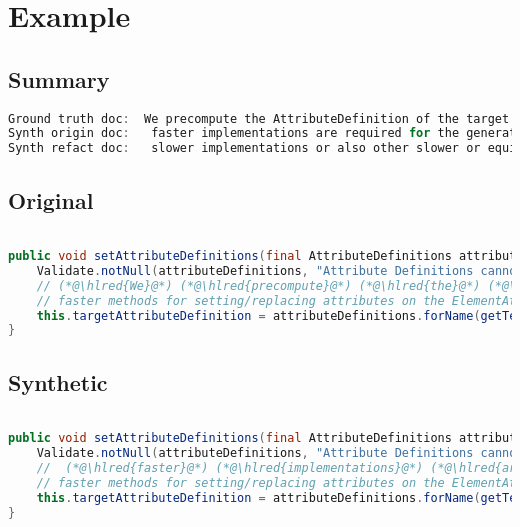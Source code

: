 \documentclass[11pt]{article}
\DeclareRobustCommand{\hlred}[1]{{\sethlcolor{YellowOrange}\hl{#1}}}
\begin{document}
\pagebreak
\section{Example}
\subsection{Summary}

\begin{lstlisting}[language=java]
Ground truth doc:  We precompute the AttributeDefinition of the target attribute in order to being able to use much
Synth origin doc:   faster implementations are required for the generation but cannot override or replace attributes instead of just
Synth refact doc:   slower implementations or also other slower or equivalent methods are encouraged and can instead invoke only
\end{lstlisting}

\subsection{Original}
\begin{lstlisting}[language=java]

public void setAttributeDefinitions(final AttributeDefinitions attributeDefinitions) {
    Validate.notNull(attributeDefinitions, "Attribute Definitions cannot be null");
    // (*@\hlred{We}@*) (*@\hlred{precompute}@*) (*@\hlred{the}@*) (*@\hlred{AttributeDefinition}@*) (*@\hlred{of}@*) the (*@\hlred{target}@*) (*@\hlred{attribute}@*) (*@\hlred{in}@*) (*@\hlred{order}@*) (*@\hlred{to}@*) (*@\hlred{being}@*) (*@\hlred{able}@*) (*@\hlred{to}@*) (*@\hlred{use}@*) (*@\hlred{much}@*)
    // faster methods for setting/replacing attributes on the ElementAttributes implementation
    this.targetAttributeDefinition = attributeDefinitions.forName(getTemplateMode(), this.targetAttrCompleteName);
}
\end{lstlisting}
\subsection{Synthetic}

\begin{lstlisting}[language=java]

public void setAttributeDefinitions(final AttributeDefinitions attributeDefinitions) {
    Validate.notNull(attributeDefinitions, "Attribute Definitions cannot be null");
    //  (*@\hlred{faster}@*) (*@\hlred{implementations}@*) (*@\hlred{are}@*) (*@\hlred{required}@*) (*@\hlred{for}@*) the (*@\hlred{generation}@*) (*@\hlred{but}@*) (*@\hlred{cannot}@*) (*@\hlred{override}@*) (*@\hlred{or}@*) (*@\hlred{replace}@*) (*@\hlred{attributes}@*) (*@\hlred{instead}@*) (*@\hlred{of}@*) (*@\hlred{just}@*)
    // faster methods for setting/replacing attributes on the ElementAttributes implementation
    this.targetAttributeDefinition = attributeDefinitions.forName(getTemplateMode(), this.targetAttrCompleteName);
}
\end{lstlisting}
\end{document}

